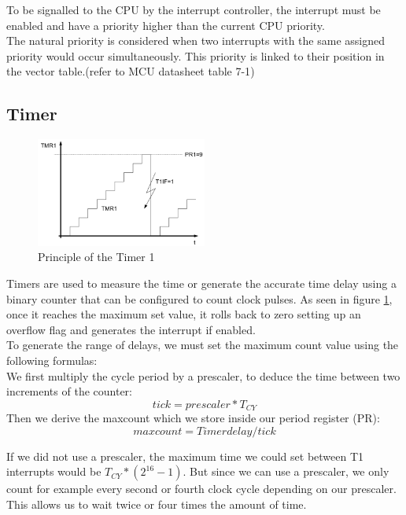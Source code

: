 \noindent
To be signalled to the CPU by the interrupt controller, the interrupt must be enabled and have a priority higher than the current CPU priority.\\
The natural priority is considered when two interrupts with the same assigned priority would occur simultaneously. This priority is linked to their position in the vector table.(refer to MCU datasheet table 7-1\cite{mcu})

\subsection{Timer}\label{subsec:timer}

\begin{figure}[H]
    \centering
    \includegraphics[width=0.5\textwidth]{figures/software/t1_demo.png}
    \caption{Principle of the Timer 1 \cite{alex}}
    \label{fig:t1_demo}
\end{figure}

Timers are used to measure the time or generate the accurate time delay using a binary counter that can be configured to count clock pulses. As seen in figure \ref{fig:t1_demo}, once it reaches the maximum set value, it rolls back to zero setting up an overflow flag and generates the interrupt if enabled. \\

\noindent
To generate the range of delays, we must set the maximum count value using the following formulas:\\
We first multiply the cycle period by a prescaler, to deduce the time between two increments of the counter:
$$tick=prescaler*T_{CY}$$
Then we derive the maxcount which we store inside our period register (PR):
$$maxcount=Timer delay/tick$$

\noindent
If we did not use a prescaler, the maximum time we could set between T1 interrupts would be $T_{CY}*(2^{16}-1)$. But since we can use a prescaler, we only count for example every second or fourth clock cycle depending on our prescaler. This allows us to wait twice or four times the amount of time.

